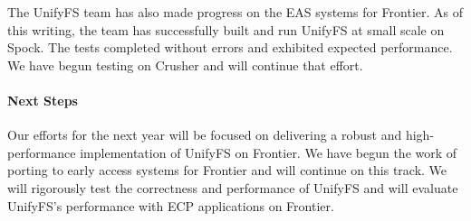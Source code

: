 %

The UnifyFS team has also made progress on the EAS systems for Frontier. As of
this writing, the team has successfully built and run UnifyFS at small scale
on Spock. The tests completed without errors and exhibited expected performance.
We have begun testing on Crusher and will continue that effort.

\paragraph{Next Steps}

Our efforts for the next year will be focused on delivering a robust and
high-performance implementation of UnifyFS on Frontier. We have begun the work
of porting to early access systems for Frontier and will continue on this track.
We will rigorously test the correctness and performance of UnifyFS and will
evaluate UnifyFS's performance with ECP applications on Frontier.

